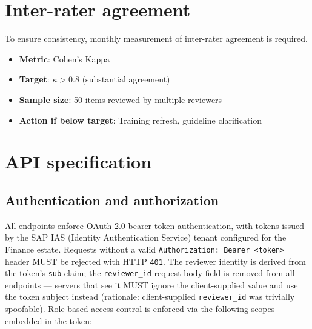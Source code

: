 \section{Inter-rater agreement}

To ensure consistency, monthly measurement of inter-rater agreement is required.

\begin{itemize}
  \item \textbf{Metric}: Cohen's Kappa
  \item \textbf{Target}: $\kappa > 0.8$ (substantial agreement)
  \item \textbf{Sample size}: 50 items reviewed by multiple reviewers
  \item \textbf{Action if below target}: Training refresh, guideline clarification
\end{itemize}

\section{API specification}

\subsection{Authentication and authorization}
\label{sec:dashboard-api-auth}

All endpoints enforce OAuth 2.0 bearer-token authentication, with
tokens issued by the SAP IAS (Identity Authentication Service)
tenant configured for the Finance estate. Requests without a valid
\texttt{Authorization:\ Bearer <token>} header MUST be rejected
with HTTP \texttt{401}. The reviewer identity is derived from the
token's \texttt{sub} claim; the \texttt{reviewer\_id} request body
field is removed from all endpoints --- servers that see it MUST
ignore the client-supplied value and use the token subject instead
(rationale: client-supplied \texttt{reviewer\_id} was trivially
spoofable). Role-based access control is enforced via the
following scopes embedded in the token:

